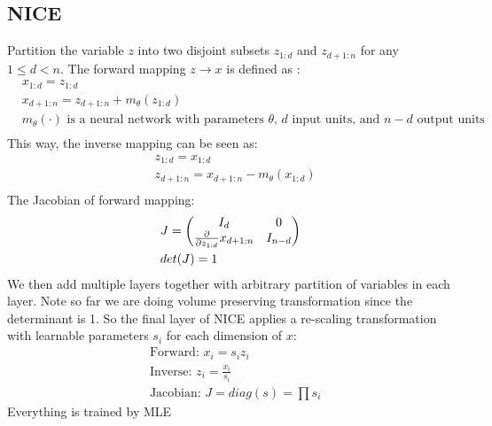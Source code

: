 \subsection{NICE}
Partition the variable $z$ into two disjoint subsets $z_{1:d}$ and $z_{d+1:n}$ for any $1 \leq d < n$. The forward mapping $z \to x$ is defined as :
    \begin{align*}
        & x_{1:d} = z_{1:d} \tag{identity transformation}\\
        & x_{d+1:n} = z_{d+1:n} + m_\theta(z_{1:d}) \\
        & \textrm{$m_\theta(\cdot)$ is a neural network with parameters $\theta$, $d$ input units, and $n-d$ output units}\\
    \end{align*}
This way, the inverse mapping can be seen as: 
    \begin{align*}
        & z_{1:d} = x_{1:d} \\
        & z_{d+1:n} = x_{d+1:n} - m_\theta(x_{1:d}) \\
    \end{align*}
The Jacobian of forward mapping: 
    \begin{align*}
        & J = \begin{pmatrix}
            I_d & 0 \\
            \frac{\partial}{\partial z_{1:d}} x_{d+1:n} & I_{n-d} \\
        \end{pmatrix} \\
        & det(J) = 1
    \end{align*}
We then add multiple layers together with arbitrary partition of variables in each layer. Note so far we are doing volume preserving transformation since the determinant is 1. So the final layer of NICE applies a re-scaling transformation with learnable parameters $s_i$ for each dimension of $x$: 
    \begin{align*}
        & \textrm{Forward: } x_i = s_i z_i \\
        & \textrm{Inverse: } z_i = \frac{x_i}{s_i} \\
        & \textrm{Jacobian: } J = diag(s) = \prod s_i
    \end{align*}
Everything is trained by MLE




